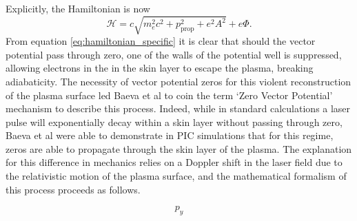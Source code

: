Explicitly, the Hamiltonian is now
\begin{equation}\label{eq:hamiltonian_specific}
	\mathcal{H} = c\sqrt{m^2_ec^2 + p^2_\mathrm{prop} + e^2A^2} + e\Phi.
\end{equation}
From equation \ref{eq:hamiltonian_specific} it is clear that should the vector potential pass through zero, one of the walls of the potential well is suppressed, allowing electrons in the in the skin layer to escape the plasma, breaking adiabaticity. The necessity of vector potential zeros for this violent reconstruction of the plasma surface led Baeva et al \cite{baeva2011ZeroVectorPotential} to coin the term `Zero Vector Potential' mechanism to describe this process. Indeed, while in standard calculations a laser pulse will exponentially decay within a skin layer without passing through zero, Baeva et al \cite{baeva2011ZeroVectorPotential} were able to demonstrate in \ac{PIC} simulations that for this regime, zeros are able to propagate through the skin layer of the plasma. The explanation for this difference in mechanics relies on a Doppler shift in the laser field due to the relativistic motion of the plasma surface, and the mathematical formalism of this process proceeds as follows.

\begin{equation}
	p_y
\end{equation}